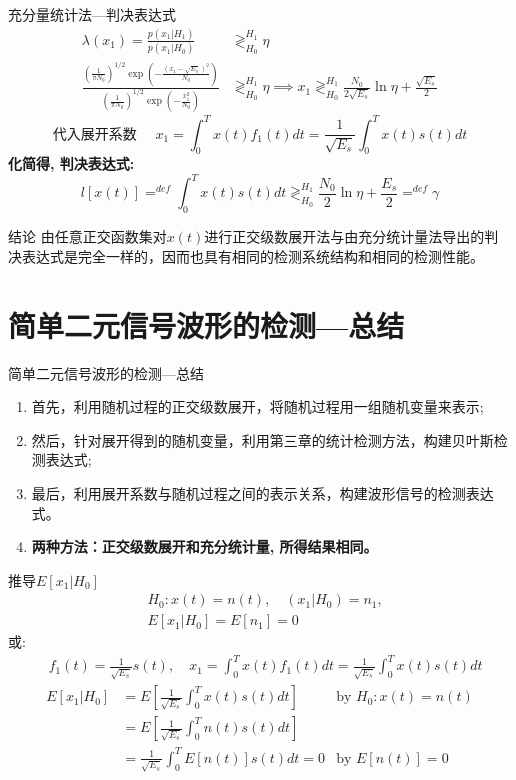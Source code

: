 \begin{frame}[shrink]{充分量统计法---判决表达式}
\begin{align*}
\lambda(x_1)=\frac{p(x_1|H_1)}{p(x_1|H_0)}&\mathop{\gtrless}_{H_0}^{H_1}\eta\\
\frac{\left(\frac{1}{\pi N_0}\right)^{1/2}\exp\left(-\frac{(x_1-\sqrt{E_s})^2}{N_0}\right)}{\left(\frac{1}{\pi N_0}\right)^{1/2}\exp\left(-\frac{x_1^2}{N_0}\right)}&\mathop{\gtrless}_{H_0}^{H_1}\eta\implies x_1\mathop{\gtrless}_{H_0}^{H_1}\frac{N_0}{2\sqrt{E_s}}\ln\eta+\frac{\sqrt{E_s}}{2}
\end{align*}
\[\text{代入展开系数 }\quad x_1=\int_{0}^{T}x(t)f_1(t)dt=\frac{1}{\sqrt{E_s}}\int_{0}^{T}x(t)s(t)dt \]
\textbf{化简得, 判决表达式:}
\[l[x(t)]\mathop{=}^{def}\int_{0}^{T}x(t)s(t)dt\mathop{\gtrless}_{H_0}^{H_1}\frac{N_0}{2}\ln\eta+\frac{E_s}{2}\mathop{=}^{def}\gamma \]
\begin{block}{结论}
由任意正交函数集对$x(t)$进行正交级数展开法与由充分统计量法导出的判决表达式是完全一样的，因而也具有相同的检测系统结构和相同的检测性能。
\end{block}
\end{frame}

\section{简单二元信号波形的检测---总结}

\begin{frame}{简单二元信号波形的检测---总结}
\begin{enumerate}
\setlength{\itemsep}{.5cm}
\item 首先，利用随机过程的正交级数展开，将随机过程用一组随机变量来表示;
\item 然后，针对展开得到的随机变量，利用第三章的统计检测方法，构建贝叶斯检测表达式;
\item 最后，利用展开系数与随机过程之间的表示关系，构建波形信号的检测表达式。
\item \textbf{两种方法：正交级数展开和充分统计量, 所得结果相同。}
\end{enumerate}
\end{frame}

\begin{frame}[shrink]{推导$E[x_1|H_0]$}
\begin{align*}
&H_0: x(t)=n(t),\quad (x_1|H_0)=n_1,\\
&E[x_1|H_0]=E[n_1]=0
\end{align*}
或:
\begin{align*}
&f_1(t)=\frac{1}{\sqrt{E_s}}s(t),\quad x_1=\int_{0}^{T}x(t)f_1(t)dt=\frac{1}{\sqrt{E_s}}\int_{0}^{T}x(t)s(t)dt
\end{align*}
\begin{align*}
E[x_1|H_0]&=E\left[\frac{1}{\sqrt{E_s}}\int_{0}^{T}x(t)s(t)dt\right] &\text{by }H_0: x(t)=n(t)\\
&=E\left[\frac{1}{\sqrt{E_s}}\int_{0}^{T}n(t)s(t)dt\right]&\\
&=\frac{1}{\sqrt{E_s}}\int_{0}^{T}E[n(t)]s(t)dt=0 &\text{by }E[n(t)]=0
\end{align*}
\end{frame}

